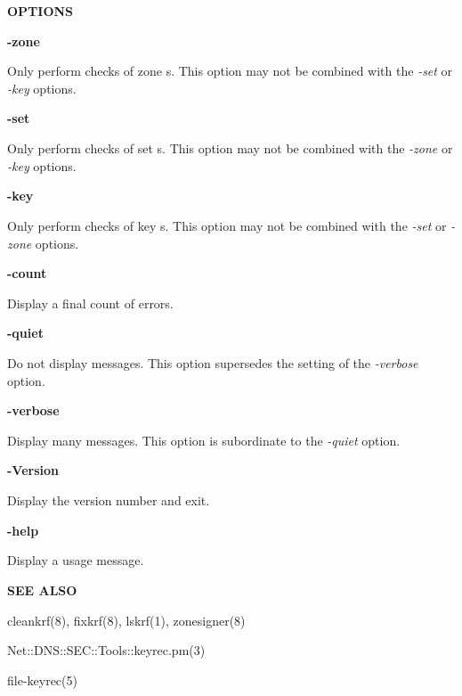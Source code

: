 {\bf OPTIONS}

\begin{description}

\item {\bf -zone}\verb" "

Only perform checks of zone s.  This option may not be combined
with the {\it -set} or {\it -key} options.

\item {\bf -set}\verb" "

Only perform checks of set s.  This option may not be combined
with the {\it -zone} or {\it -key} options.

\item {\bf -key}\verb" "

Only perform checks of key s.  This option may not be combined
with the {\it -set} or {\it -zone} options.

\item {\bf -count}\verb" "

Display a final count of errors.

\item {\bf -quiet}\verb" "

Do not display messages.  This option supersedes the setting of the
{\it -verbose} option.

\item {\bf -verbose}\verb" "

Display many messages.  This option is subordinate to the {\it -quiet} option.

\item {\bf -Version}\verb" "

Display the  version number and exit.

\item {\bf -help}\verb" "

Display a usage message.

\end{description}

{\bf SEE ALSO}

cleankrf(8),
fixkrf(8),
lskrf(1),
zonesigner(8)

Net::DNS::SEC::Tools::keyrec.pm(3)

file-keyrec(5)

